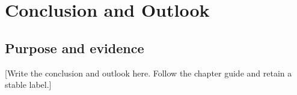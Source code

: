 \chapter{Conclusion and Outlook}
\label{chap:conclusion_and_outlook}
\section{Purpose and evidence}
[Write the conclusion and outlook here. Follow the chapter guide and retain a stable label.]
